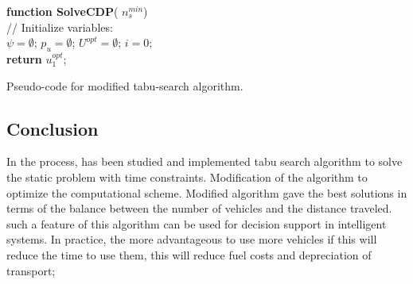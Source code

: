 \documentclass[]{TAACpaper}
\begin{document}
\begin{algorithm}[H]
	\textbf{function SolveCDP}( $n^{min}_s$) \\
	// Initialize variables:	\\
	
	$\psi = \emptyset$;
	$p_u = \emptyset$;
	$U^{opt} = \emptyset$;
	$i=0$; \\
	
	\textbf{return} $u^{opt}_1$;
	
	\caption{Pseudo-code for modified tabu-search algorithm.}
	\label{alg:modTabuSearch}
\end{algorithm}

\subsection{Conclusion}
In the process, has been studied and implemented tabu search algorithm to solve the static problem with time constraints. Modification of the algorithm to optimize the computational scheme. Modified algorithm gave the best solutions in terms of the balance between the number of vehicles and the distance traveled. such a feature of this algorithm can be used for decision support in intelligent systems. In practice, the more advantageous to use more vehicles if this will reduce the time to use them, this will reduce fuel costs and depreciation of transport;
\end{document}
